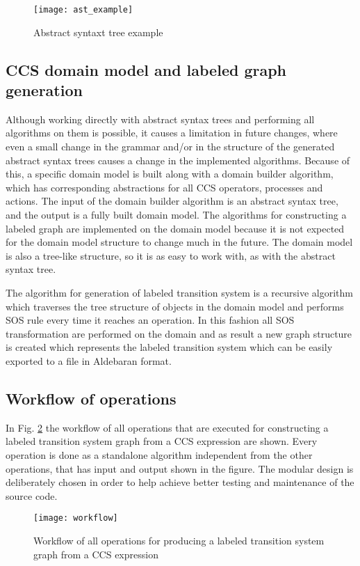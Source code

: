 \begin{figure}[!t]
\centering
\texttt{[image: ast\_example]}
\caption{Abstract syntaxt tree example}
\label{fig:ast_example}
\end{figure}

\subsection{CCS domain model and labeled graph generation}
Although working directly with abstract syntax trees and performing all algorithms on them is possible, it causes 
a limitation in future changes, where even a small change in the grammar and/or in the structure of the
generated abstract syntax trees causes a change in the implemented algorithms. Because of this,
a specific domain model is built along with a domain builder algorithm, which has corresponding
abstractions for all CCS operators, processes and actions. The input of the domain builder algorithm 
is an abstract syntax tree, and the output is a fully built domain model. The algorithms for constructing a labeled graph 
are implemented on the domain model because it is not expected for the domain model structure to 
change much in the future. The domain model is also a tree-like structure, so it is as easy to work with, 
as with the abstract syntax tree. 

The algorithm for generation of labeled transition system is a recursive algorithm which traverses the tree structure of objects 
in the domain model and performs SOS rule every time it reaches an operation.
In this fashion all SOS transformation are performed on the domain and as result a new graph
structure is created which represents the labeled transition system which can be easily exported to a file
in Aldebaran format.

\subsection{Workflow of operations}
In  Fig. \ref{fig:workflow} the workflow of all operations that are executed for constructing a labeled transition system graph from a 
CCS expression are shown. Every operation is done as a standalone algorithm independent from the other operations,
that has input and output shown in the figure. The modular design is deliberately chosen in order to help achieve better 
testing and maintenance of the source code. 

\begin{figure}[h]
\centering
\texttt{[image: workflow]}
\caption{Workflow of all operations for producing a labeled transition system graph from a CCS expression}
\label{fig:workflow}
\end{figure}
